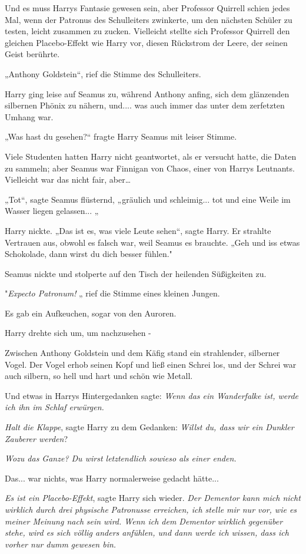{Und es muss Harrys Fantasie gewesen sein, aber Professor Quirrell schien jedes Mal, wenn der Patronus des Schulleiters zwinkerte, um den nächsten Schüler zu testen, leicht zusammen zu zucken. Vielleicht stellte sich Professor Quirrell den gleichen Placebo-Effekt wie Harry vor, diesen Rückstrom der Leere, der seinen Geist berührte.

„Anthony Goldstein“, rief die Stimme des Schulleiters.

Harry ging leise auf Seamus zu, während Anthony anfing, sich dem glänzenden silbernen Phönix zu nähern, und.... was auch immer das unter dem zerfetzten Umhang war.

„Was hast du gesehen?“ fragte Harry Seamus mit leiser Stimme.

Viele Studenten hatten Harry nicht geantwortet, als er versucht hatte, die Daten zu sammeln; aber Seamus war Finnigan von Chaos, einer von Harrys Leutnants. Vielleicht war das nicht fair, aber…

„Tot“, sagte Seamus flüsternd, „gräulich und schleimig... tot und eine Weile im Wasser liegen gelassen... „

Harry nickte. „Das ist es, was viele Leute sehen“, sagte Harry. Er strahlte Vertrauen aus, obwohl es falsch war, weil Seamus es brauchte. „Geh und iss etwas Schokolade, dann wirst du dich besser fühlen."

Seamus nickte und stolperte auf den Tisch der heilenden Süßigkeiten zu.

"\emph{Expecto Patronum!} „ rief die Stimme eines kleinen Jungen.

Es gab ein Aufkeuchen, sogar von den Auroren.

Harry drehte sich um, um nachzusehen -

Zwischen Anthony Goldstein und dem Käfig stand ein strahlender, silberner Vogel. Der Vogel erhob seinen Kopf und ließ einen Schrei los, und der Schrei war auch silbern, so hell und hart und schön wie Metall.

Und etwas in Harrys Hintergedanken sagte: \emph{Wenn das ein Wanderfalke ist, werde ich ihn im Schlaf erwürgen.}

\emph{Halt die Klappe}, sagte Harry zu dem Gedanken: \emph{Willst du, dass wir ein Dunkler Zauberer werden}?

\emph{\emph{Wozu das Ganze? Du wirst letztendlich sowieso als einer enden.}}

Das... war nichts, was Harry normalerweise gedacht hätte...

\emph{Es ist ein Placebo-Effekt}, sagte Harry sich wieder. \emph{Der Dementor kann mich nicht wirklich durch drei physische} \emph{Patronusse} \emph{erreichen, ich stelle mir nur vor, wie es meiner Meinung nach} \emph{sein wird. Wenn ich dem Dementor} \emph{wirklich} \emph{gegenüber stehe, wird es sich völlig anders anfühlen, und dann werde ich wissen, dass ich vorher nur dumm} \emph{gewesen bin.}

}
